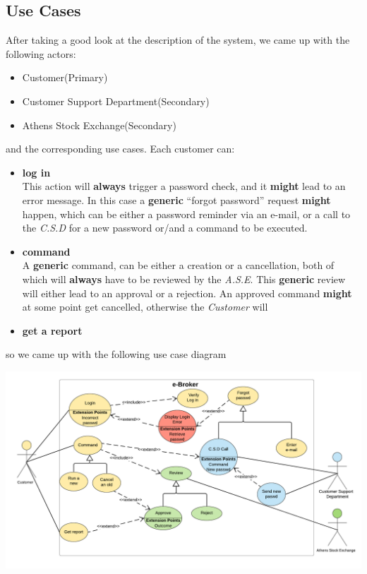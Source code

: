 \documentclass{article}
\begin{document}
\subsection{Use Cases}
After taking a good look at the description of the system, we came up with the following actors:
\begin{itemize}
\item Customer(Primary)
\item Customer Support Department(Secondary)
\item Athens Stock Exchange(Secondary)
\end{itemize}
 and the corresponding use cases. Each customer can:
\begin{itemize}
\item \textbf{log in}\\This action will \textbf{always} trigger a password check, and it 
\textbf{might} lead to an error message. In this case a \textbf{generic} ``forgot password'' request \textbf{might} happen, which can be either a password reminder via an e-mail, or a call to the \textit{C.S.D} for a new password or/and a command to be executed.
\item \textbf{command}\\A \textbf{generic} command, can be either a creation or a cancellation, both of which will \textbf{always} have to be reviewed by the \textit{A.S.E}. This \textbf{generic} review will either lead to an approval or a rejection. An approved command \textbf{might} at some point get cancelled, otherwise the \textit{Customer} will 
\item \textbf{get a report}
\end{itemize}
so we came up with the following use case diagram\\
\begin{center}
	\includegraphics[scale=0.3]{use_cases}
\end{center}
\end{document}
